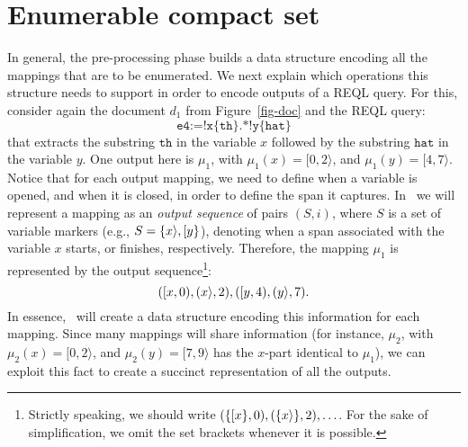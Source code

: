\section{Enumerable compact set} 
In general, the pre-processing phase builds a  data structure encoding all the
mappings that are to be enumerated. We next explain which operations this
structure needs to support in order to encode outputs of a REQL query. For this,
consider again the document $d_1$ from Figure~\ref{fig-doc} and the REQL query:
$$
\texttt{e4} := \texttt{!x\{th\}.*!y\{hat\}}
$$
%
that extracts the substring $\texttt{th}$ in the variable $x$ followed by the
substring $\texttt{hat}$ in the variable $y$. One output here is $\mu_1$, with
$\mu_1(x) = [0,2\rangle$, and $\mu_1(y) = [4,7\rangle$. Notice that for each
output mapping, we need to define when a variable is opened, and when it is
closed, in order to define the span it captures. In \rematch\ we will represent
a mapping as an \emph{output sequence} of pairs $(S,i)$, where $S$ is a set of
variable markers (e.g., $S=\{x \rangle, [ y\}$), denoting when a span
associated with the variable $x$ starts, or finishes, respectively. Therefore,
the mapping $\mu_1$ is represented by the output sequence\footnote{Strictly
speaking, we should write $(\{[ x\},0),(\{x \rangle\},2),\ldots$. For the
sake of simplification, we omit the set brackets whenever it is possible.}:
$$
([ x,0),(x \rangle,2),([ y,4),(y \rangle,7).
$$
In essence, \rematch\ will create a data structure encoding this information for
each mapping. Since many mappings will share information (for instance, $\mu_2$,
with $\mu_2(x)=[0,2\rangle$, and $\mu_2(y)=[7,9\rangle$ has the $x$-part
identical to $\mu_1$), we can exploit this fact to create a succinct
representation of all the outputs.

